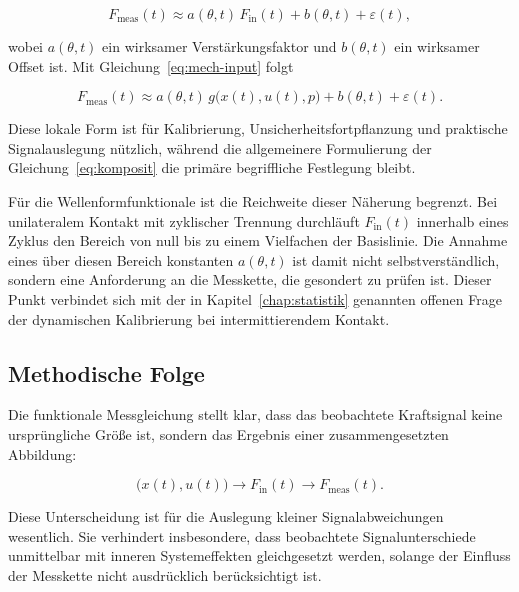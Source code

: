 \documentclass[12pt,a4paper]{report}
\begin{document}
\begin{equation}
F_{\mathrm{meas}}(t) \approx a(\theta,t)\, F_{\mathrm{in}}(t) + b(\theta,t) + \varepsilon(t),
\label{eq:linear}
\end{equation}

wobei $a(\theta,t)$ ein wirksamer Verstärkungsfaktor und $b(\theta,t)$
ein wirksamer Offset ist. Mit Gleichung~\eqref{eq:mech-input} folgt

\begin{equation}
F_{\mathrm{meas}}(t) \approx a(\theta,t)\, g\bigl(x(t),u(t),p\bigr) + b(\theta,t) + \varepsilon(t).
\label{eq:linear-g}
\end{equation}

Diese lokale Form ist für Kalibrierung, Unsicherheitsfortpflanzung und
praktische Signalauslegung nützlich, während die allgemeinere
Formulierung der Gleichung~\eqref{eq:komposit} die primäre begriffliche
Festlegung bleibt.

Für die Wellenformfunktionale ist die Reichweite dieser Näherung
begrenzt. Bei unilateralem Kontakt mit zyklischer Trennung durchläuft
$F_{\mathrm{in}}(t)$ innerhalb eines Zyklus den Bereich von null bis zu
einem Vielfachen der Basislinie. Die Annahme eines über diesen Bereich
konstanten $a(\theta,t)$ ist damit nicht selbstverständlich, sondern eine
Anforderung an die Messkette, die gesondert zu prüfen ist. Dieser Punkt
verbindet sich mit der in Kapitel~\ref{chap:statistik} genannten offenen
Frage der dynamischen Kalibrierung bei intermittierendem Kontakt.

\subsection{Methodische Folge}

Die funktionale Messgleichung stellt klar, dass das beobachtete
Kraftsignal keine ursprüngliche Größe ist, sondern das Ergebnis einer
zusammengesetzten Abbildung:

\begin{equation}
\bigl(x(t), u(t)\bigr) \rightarrow F_{\mathrm{in}}(t) \rightarrow F_{\mathrm{meas}}(t).
\label{eq:kette}
\end{equation}

Diese Unterscheidung ist für die Auslegung kleiner Signalabweichungen
wesentlich. Sie verhindert insbesondere, dass beobachtete
Signalunterschiede unmittelbar mit inneren Systemeffekten gleichgesetzt
werden, solange der Einfluss der Messkette nicht ausdrücklich
berücksichtigt ist.
\end{document}

